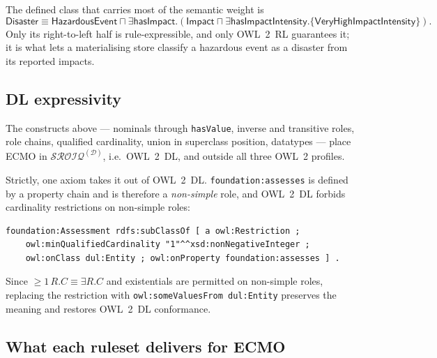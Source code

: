 \documentclass[11pt,a4paper]{article}
\newcommand{\dl}[1]{\ensuremath{\mathcal{#1}}}
\newcommand{\SROIQ}{\dl{SROIQ}}
\newcommand{\cn}[1]{\mathsf{#1}}      %
\newcommand{\rn}[1]{\mathsf{#1}}      %
\newcommand{\ind}[1]{\mathsf{#1}}     %
\newcommand{\eqv}{\equiv}
\begin{document}
\noindent
The defined class that carries most of the semantic weight is
\[
  \cn{Disaster} \eqv \cn{HazardousEvent} \sqcap
  \exists \rn{hasImpact}.(\cn{Impact} \sqcap
  \exists \rn{hasImpactIntensity}.\{\ind{VeryHighImpactIntensity}\}).
\]
Only its right-to-left half is rule-expressible, and only OWL~2~RL guarantees
it; it is what lets a materialising store classify a hazardous event as a
disaster from its reported impacts.

\subsection*{DL expressivity}

The constructs above --- nominals through \texttt{hasValue}, inverse and
transitive roles, role chains, qualified cardinality, union in superclass
position, datatypes --- place ECMO in $\SROIQ^{(\mathcal{D})}$, i.e.\ OWL~2~DL,
and outside all three OWL~2 profiles.

Strictly, one axiom takes it out of OWL~2~DL. \texttt{foundation:assesses} is
defined by a property chain and is therefore a \emph{non-simple} role, and
OWL~2~DL forbids cardinality restrictions on non-simple roles:
\begin{lstlisting}
foundation:Assessment rdfs:subClassOf [ a owl:Restriction ;
    owl:minQualifiedCardinality "1"^^xsd:nonNegativeInteger ;
    owl:onClass dul:Entity ; owl:onProperty foundation:assesses ] .
\end{lstlisting}
Since ${\geq}1\,R.C \equiv \exists R.C$ and existentials are permitted on
non-simple roles, replacing the restriction with
\texttt{owl:someValuesFrom dul:Entity} preserves the meaning and restores
OWL~2~DL conformance.

\subsection*{What each ruleset delivers for ECMO}
\end{document}
